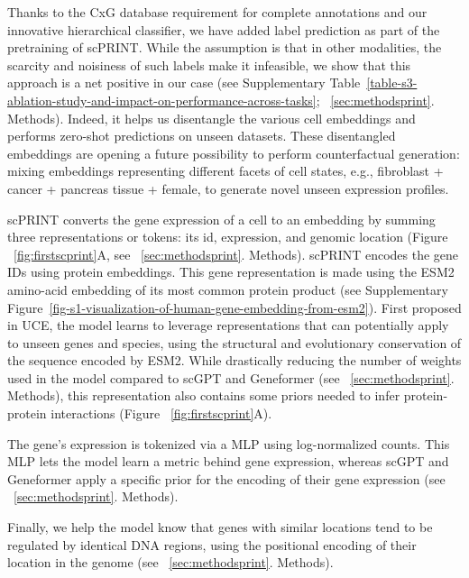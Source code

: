 Thanks to the \gls{CxG} database requirement for complete annotations and our innovative hierarchical classifier, we have added label prediction as part of the pretraining of \gls{scPRINT}. While the assumption is that in other modalities, the scarcity and noisiness of such labels make it infeasible, we show that this approach is a net positive in our case (see Supplementary Table~\ref{table-s3-ablation-study-and-impact-on-performance-across-tasks}; ~\ref{sec:methodsprint}. Methods). Indeed, it helps us disentangle the various cell embeddings and performs zero-shot predictions on unseen datasets. These disentangled embeddings are opening a future possibility to perform counterfactual generation: mixing embeddings representing different facets of cell states, e.g., fibroblast + cancer + pancreas tissue + female, to generate novel unseen expression profiles.

\gls{scPRINT} converts the gene expression of a cell to an embedding by summing three representations or tokens: its id, expression, and genomic location (Figure ~\ref{fig:firstscprint}A, see ~\ref{sec:methodsprint}. Methods). \gls{scPRINT} encodes the gene IDs using protein embeddings. This gene representation is made using the \gls{ESM}2\citep{rivesBiologicalStructureFunction2021} amino-acid embedding of its most common protein product (see Supplementary Figure~\ref{fig-s1-visualization-of-human-gene-embedding-from-esm2}). First proposed in \gls{UCE}\citep{rosenUniversalCellEmbeddings2023}, the model learns to leverage representations that can potentially apply to unseen genes and species, using the structural and evolutionary conservation of the sequence encoded by \gls{ESM}2. While drastically reducing the number of weights used in the model compared to \gls{scGPT} and Geneformer (see ~\ref{sec:methodsprint}. Methods), this representation also contains some priors needed to infer protein-protein\citep{huImprovingProteinproteinInteraction2024} interactions (Figure ~\ref{fig:firstscprint}A). 

The gene's expression is tokenized via a \gls{MLP} using log-normalized counts. This \gls{MLP} lets the model learn a metric behind gene expression, whereas \gls{scGPT} and Geneformer apply a specific prior for the encoding of their gene expression (see ~\ref{sec:methodsprint}. Methods).

Finally, we help the model know that genes with similar locations tend to be regulated by identical \gls{DNA} regions, using the positional encoding of their location in the genome (see ~\ref{sec:methodsprint}. Methods).

